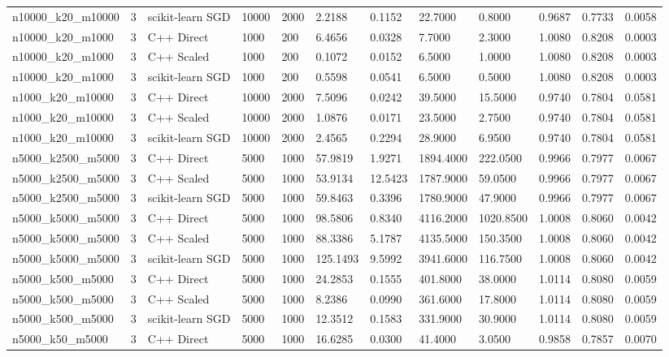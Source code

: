 \begin{table}[htbp]
\begin{tabular}{llllllllllll}
n10000\_k20\_m10000 & 3 & scikit-learn SGD & 10000 & 2000 & 2.2188 & 0.1152 & 22.7000 & 0.8000 & 0.9687 & 0.7733 & 0.0058 \\
n10000\_k20\_m1000 & 3 & C++ Direct & 1000 & 200 & 6.4656 & 0.0328 & 7.7000 & 2.3000 & 1.0080 & 0.8208 & 0.0003 \\
n10000\_k20\_m1000 & 3 & C++ Scaled & 1000 & 200 & 0.1072 & 0.0152 & 6.5000 & 1.0000 & 1.0080 & 0.8208 & 0.0003 \\
n10000\_k20\_m1000 & 3 & scikit-learn SGD & 1000 & 200 & 0.5598 & 0.0541 & 6.5000 & 0.5000 & 1.0080 & 0.8208 & 0.0003 \\
n1000\_k20\_m10000 & 3 & C++ Direct & 10000 & 2000 & 7.5096 & 0.0242 & 39.5000 & 15.5000 & 0.9740 & 0.7804 & 0.0581 \\
n1000\_k20\_m10000 & 3 & C++ Scaled & 10000 & 2000 & 1.0876 & 0.0171 & 23.5000 & 2.7500 & 0.9740 & 0.7804 & 0.0581 \\
n1000\_k20\_m10000 & 3 & scikit-learn SGD & 10000 & 2000 & 2.4565 & 0.2294 & 28.9000 & 6.9500 & 0.9740 & 0.7804 & 0.0581 \\
n5000\_k2500\_m5000 & 3 & C++ Direct & 5000 & 1000 & 57.9819 & 1.9271 & 1894.4000 & 222.0500 & 0.9966 & 0.7977 & 0.0067 \\
n5000\_k2500\_m5000 & 3 & C++ Scaled & 5000 & 1000 & 53.9134 & 12.5423 & 1787.9000 & 59.0500 & 0.9966 & 0.7977 & 0.0067 \\
n5000\_k2500\_m5000 & 3 & scikit-learn SGD & 5000 & 1000 & 59.8463 & 0.3396 & 1780.9000 & 47.9000 & 0.9966 & 0.7977 & 0.0067 \\
n5000\_k5000\_m5000 & 3 & C++ Direct & 5000 & 1000 & 98.5806 & 0.8340 & 4116.2000 & 1020.8500 & 1.0008 & 0.8060 & 0.0042 \\
n5000\_k5000\_m5000 & 3 & C++ Scaled & 5000 & 1000 & 88.3386 & 5.1787 & 4135.5000 & 150.3500 & 1.0008 & 0.8060 & 0.0042 \\
n5000\_k5000\_m5000 & 3 & scikit-learn SGD & 5000 & 1000 & 125.1493 & 9.5992 & 3941.6000 & 116.7500 & 1.0008 & 0.8060 & 0.0042 \\
n5000\_k500\_m5000 & 3 & C++ Direct & 5000 & 1000 & 24.2853 & 0.1555 & 401.8000 & 38.0000 & 1.0114 & 0.8080 & 0.0059 \\
n5000\_k500\_m5000 & 3 & C++ Scaled & 5000 & 1000 & 8.2386 & 0.0990 & 361.6000 & 17.8000 & 1.0114 & 0.8080 & 0.0059 \\
n5000\_k500\_m5000 & 3 & scikit-learn SGD & 5000 & 1000 & 12.3512 & 0.1583 & 331.9000 & 30.9000 & 1.0114 & 0.8080 & 0.0059 \\
n5000\_k50\_m5000 & 3 & C++ Direct & 5000 & 1000 & 16.6285 & 0.0300 & 41.4000 & 3.0500 & 0.9858 & 0.7857 & 0.0070 \\

\end{tabular}
\end{table}
